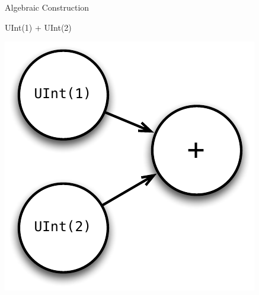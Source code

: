 \documentclass[xcolor=pdflatex,dvipsnames,table]{beamer}
\begin{document}
\begin{frame}[fragile]{Algebraic Construction}

\begin{scala}
UInt(1) + UInt(2)
\end{scala}

\begin{center}
\includegraphics[height=0.7\textheight]{figs/add.pdf} 
\end{center}

\end{frame}
\end{document}

